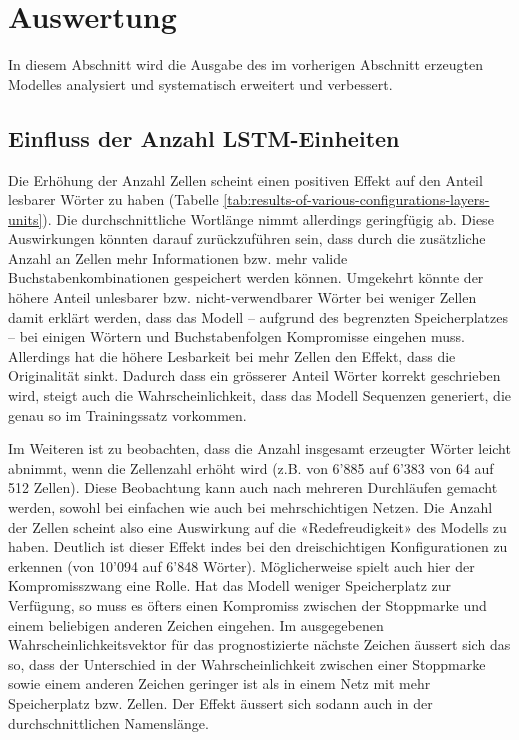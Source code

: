 \chapter{Auswertung}
\label{ch:analysis}

In diesem Abschnitt wird die Ausgabe des im vorherigen Abschnitt erzeugten Modelles analysiert und
systematisch erweitert und verbessert.

\section{Einfluss der Anzahl LSTM-Einheiten}
\label{sec:increase-lstm}

Die Erhöhung der Anzahl Zellen scheint einen positiven Effekt auf den Anteil lesbarer Wörter zu haben (Tabelle \ref{tab:results-of-various-configurations-layers-units}).
Die durchschnittliche Wortlänge nimmt allerdings geringfügig ab.
Diese Auswirkungen könnten darauf zurückzuführen sein, dass durch die zusätzliche Anzahl an Zellen mehr Informationen bzw. mehr valide Buchstabenkombinationen gespeichert werden können.
Umgekehrt könnte der höhere Anteil unlesbarer bzw. nicht-verwendbarer Wörter bei weniger Zellen damit erklärt werden,
dass das Modell – aufgrund des begrenzten Speicherplatzes – bei einigen Wörtern und Buchstabenfolgen Kompromisse eingehen muss.
Allerdings hat die höhere Lesbarkeit bei mehr Zellen den Effekt, dass die Originalität sinkt.
Dadurch dass ein grösserer Anteil Wörter korrekt geschrieben wird, steigt auch die Wahrscheinlichkeit, dass das Modell Sequenzen generiert, die genau so im Trainingssatz vorkommen.

Im Weiteren ist zu beobachten, dass die Anzahl insgesamt erzeugter Wörter leicht abnimmt, wenn die Zellenzahl erhöht wird (z.B. von 6'885 auf 6'383 von 64 auf 512 Zellen).
Diese Beobachtung kann auch nach mehreren Durchläufen gemacht werden, sowohl bei einfachen wie auch bei mehrschichtigen Netzen.
Die Anzahl der Zellen scheint also eine Auswirkung auf die «Redefreudigkeit» des Modells zu haben.
Deutlich ist dieser Effekt indes bei den dreischichtigen Konfigurationen zu erkennen (von 10'094 auf 6'848 Wörter).
Möglicherweise spielt auch hier der Kompromisszwang eine Rolle.
Hat das Modell weniger Speicherplatz zur Verfügung, so muss es öfters einen Kompromiss zwischen der Stoppmarke und einem beliebigen anderen Zeichen eingehen.
Im ausgegebenen Wahrscheinlichkeitsvektor für das prognostizierte nächste Zeichen äussert sich das so, dass der Unterschied in der Wahrscheinlichkeit zwischen einer Stoppmarke sowie einem
anderen Zeichen geringer ist als in einem Netz mit mehr Speicherplatz bzw. Zellen.
Der Effekt äussert sich sodann auch in der durchschnittlichen Namenslänge.

